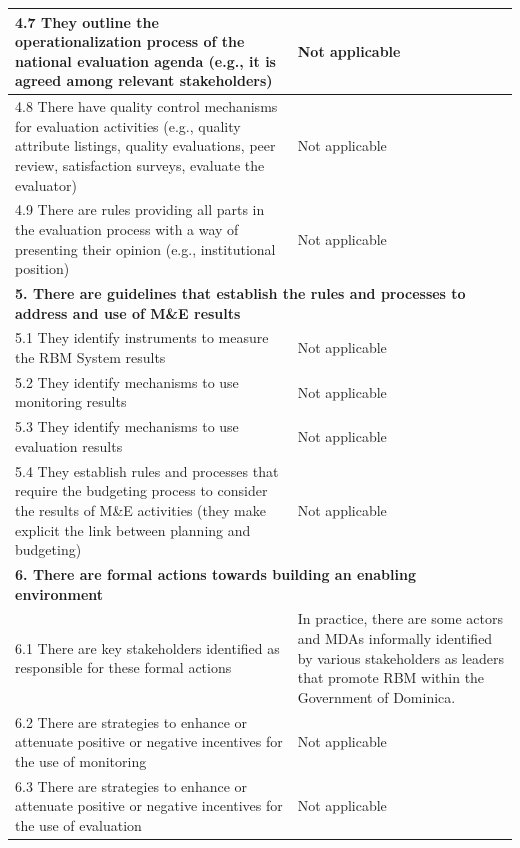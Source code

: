 \documentclass[
  10pt,
]{book}
\begin{document}
\begin{table}
\begin{tabular}[t]{l|l}
\hline
\hspace{1em}4.7 They outline the operationalization process of the national evaluation agenda (e.g., it is agreed among relevant stakeholders) & Not applicable\\
\hline
\hspace{1em}4.8 There have quality control mechanisms for evaluation activities (e.g., quality attribute listings, quality evaluations, peer review, satisfaction surveys, evaluate the evaluator) & Not applicable\\
\hline
\hspace{1em}4.9 There are rules providing all parts in the evaluation process with a way of presenting their opinion (e.g., institutional position) & Not applicable\\
\hline
\multicolumn{2}{l}{\textbf{5. There are guidelines that establish the rules and processes to address and use of M\&E results}}\\
\hline
\hspace{1em}5.1 They identify instruments to measure the RBM System results & Not applicable\\
\hline
\hspace{1em}5.2 They identify mechanisms to use monitoring results & Not applicable\\
\hline
\hspace{1em}5.3 They identify mechanisms to use evaluation results & Not applicable\\
\hline
\hspace{1em}5.4 They establish rules and processes that require the budgeting process to consider the results of M\&E activities (they make explicit the link between planning and budgeting) & Not applicable\\
\hline
\multicolumn{2}{l}{\textbf{6. There are formal actions towards building an enabling environment}}\\
\hline
\hspace{1em}6.1 There are key stakeholders identified as responsible for these formal actions & In practice, there are some actors and MDAs informally identified by various stakeholders as leaders that promote RBM within the Government of Dominica.\\
\hline
\hspace{1em}6.2 There are strategies to enhance or attenuate positive or negative incentives for the use of monitoring & Not applicable\\
\hline
\hspace{1em}6.3 There are strategies to enhance or attenuate positive or negative incentives for the use of evaluation & Not applicable\\

\end{tabular}
\end{table}
\end{document}
